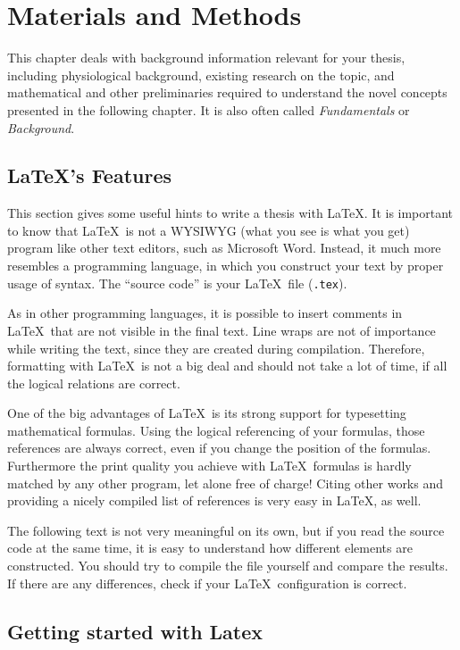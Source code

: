 \chapter{Materials and Methods}
\label{chap:materials-and-methods}

This chapter deals with background information relevant for your thesis, including physiological background, existing research on the topic, and mathematical and other preliminaries required to understand the novel concepts presented in the following chapter.
It is also often called \emph{Fundamentals} or \emph{Background}.

\section{\LaTeX's Features}

This section gives some useful hints to write a thesis with \LaTeX. 
It is important to know that \LaTeX\ is not a WYSIWYG (what you see is what you get) program like other text editors, such as Microsoft Word.
Instead, it much more resembles a programming language, in which you construct your text by proper usage of syntax.
The ``source code'' is your \LaTeX\ file (\texttt{.tex}). 

As in other programming languages, it is possible to insert comments in \LaTeX\ that are not visible in the final text. 
Line wraps are not of importance while writing the text, since they are created during compilation.
Therefore, formatting with \LaTeX\ is not a big deal and should not take a lot of time, if all the logical relations are correct.

One of the big advantages of \LaTeX\ is its strong support for typesetting mathematical formulas. 
Using the logical referencing of your formulas, those references are always correct, even if you change the position of the formulas. 
Furthermore the print quality you achieve with \LaTeX\ formulas is hardly matched by any other program, let alone free of charge!
Citing other works and providing a nicely compiled list of references is very easy in \LaTeX, as well.

The following text is not very meaningful on its own, but if you read the source code at the same time, it is easy to understand how different elements are constructed. 
You should try to compile the file yourself and compare the results. 
If there are any differences, check if your \LaTeX\ configuration is correct.

\section{Getting started with Latex}
\label{sec:getting-started-with}

